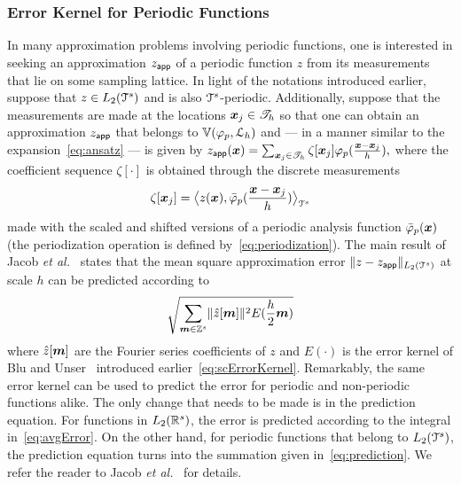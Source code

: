 \subsubsection{Error Kernel for Periodic Functions}
\label{sec:periodicErrorKernel}
In many approximation problems involving periodic functions, one is interested in seeking an approximation $\appf{z}$ of a periodic function $z$ from its measurements that lie on some sampling lattice. 
In light of the notations introduced earlier, suppose that $z \in L_2(\cube^s)$ and is also $\cube^s$-periodic. 
Additionally, suppose that the measurements are made at the locations $\vect{x}_j \in \pointset{T}_h$ so that one can obtain an approximation $\appf{z}$ that belongs to  $\aspace{\lattice{L}_h}{\varphi_p}$ and --- in a manner similar to the expansion~\eqref{eq:ansatz} --- is given by
$
  \appf{z}(\vect{x}) = \sum_{\vect{x}_j \in \pointset{T}_h}
  \zeta[\vect{x}_j] \varphi_p(\frac{\vect{x}-\vect{x}_j}{h}),
$
where the coefficient sequence $\zeta[\cdot]$ is obtained through the discrete measurements
\begin{equation}
  \zeta[\vect{x}_j] = \innerproduct{z(\vect{x})}{\analysis{\varphi}_p(\frac{\vect{x} - \vect{x}_j}{h})}
\label{eq:measurements}
\end{equation}
made with the scaled and shifted versions of a periodic analysis function $\analysis{\varphi}_p(\vect{x})$ (the periodization operation is defined by~\eqref{eq:periodization}). 
The main result of Jacob \textit{et al.}~\cite{jacob02} states that the mean square approximation error $\LLnorm{z - \appf{z}}$ at scale $h$ can be predicted according to
\begin{equation}
  \sqrt{\sum_{\vect{m} \in \ints^s} \norm{\ft{z}[\vect{m}]}^2 E(\frac{h}{2}\vect{m})}
\label{eq:prediction}
\end{equation}
where $\ft{z}[\vect{m}]$ are the Fourier series coefficients of $z$ and $E(\cdot)$ is the error kernel of Blu and Unser~\cite{blu99} introduced earlier~\eqref{eq:scErrorKernel}.  Remarkably, the same error kernel can be used to predict the error for periodic and
non-periodic functions alike. 
The only change that needs to be made is in the prediction equation. 
For functions in $L_2(\reel^s)$, the error is predicted according to the integral in~\eqref{eq:avgError}. 
On the other hand, for periodic functions that belong to $L_2(\cube^s)$, the prediction equation turns into the summation given in~\eqref{eq:prediction}. 
We refer the reader to Jacob \textit{et al.}~\cite{jacob02} for details.

